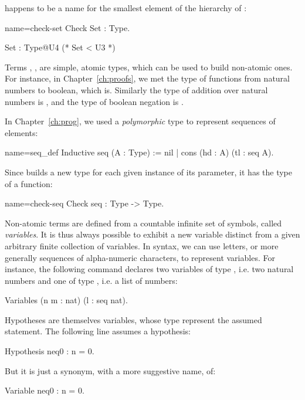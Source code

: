  happens to be a name for the smallest element of the
hierarchy of :

\begin{coq-left}{name=check-set}{}
Check Set : Type.
\end{coq-left}
\begin{coqout-right}
Set : Type@{U4} (* Set < U3 *)
\end{coqout-right}

Terms , ,  are simple, atomic types, which can be used
to build non-atomic ones. For instance, in Chapter~\ref{ch:proofs}, we
met the type of functions from natural numbers to boolean, which is.
Similarly the type of addition over natural numbers is 
, and the type of boolean negation is 
.

In Chapter~\ref{ch:prog}, we used a \emph{polymorphic} type to represent
sequences of elements:

\begin{coq}{name=seq_def}{}
Inductive seq (A : Type) := nil | cons (hd : A) (tl : seq A).
\end{coq}

Since  builds a new type for each given instance of its
parameter, it has the type of a function:

\begin{coq}{name=check-seq}{}
Check seq : Type -> Type.
\end{coq}

Non-atomic terms are defined from a countable infinite set of
symbols, called  \emph{variables}.
It is thus always possible to exhibit a new variable
distinct from a given arbitrary finite collection of variables. In \Coq{}
syntax, we can use letters, or more generally sequences of
alpha-numeric characters, to represent variables. For instance, the
following command declares two variables of type , i.e. two
natural numbers and one of type , i.e. a list of numbers:

\begin{coq}{}{}
Variables (n m : nat) (l : seq nat).
\end{coq}

Hypotheses are themselves variables, whose type represent the
assumed statement. The following line assumes a hypothesis:

\begin{coq}{}{}
Hypothesis neq0 : n = 0.
\end{coq}
But it is just a synonym, with a more suggestive name, of:
\begin{coq}{}{}
Variable neq0 : n = 0.
\end{coq}

